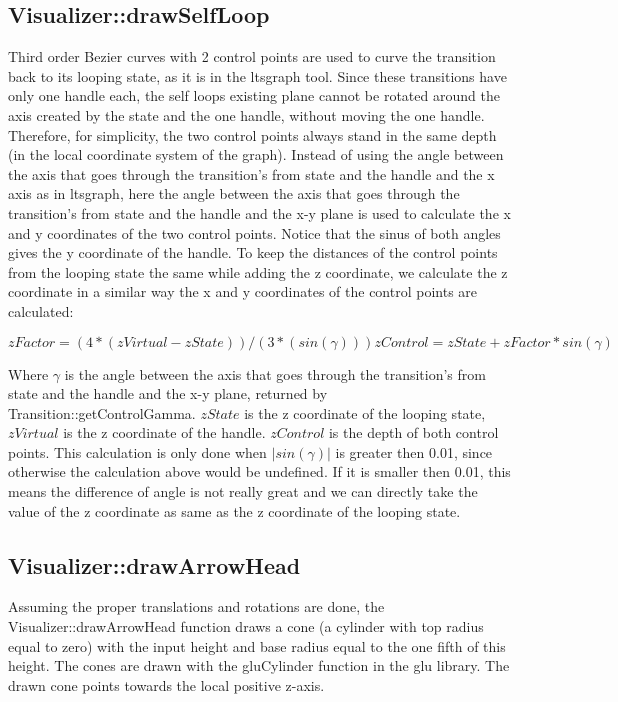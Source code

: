 \documentclass[a4paper]{article}
\begin{document}
\subsection{Visualizer::drawSelfLoop}
Third order Bezier curves with 2 control points are used to curve the transition back to its looping state, as it is in the ltsgraph tool. Since these transitions have only one handle each, the self loops existing plane cannot be rotated around the axis created by the state and the one handle, without moving the one handle. Therefore, for simplicity, the two control points always stand in the same depth (in the local coordinate system of the graph). Instead of using the angle between the axis that goes through the transition's from state and the handle and the x axis as in ltsgraph, here the angle between the axis that goes through the transition's from state and the handle and the x-y plane is used to calculate the x and y coordinates of the two control points. Notice that the sinus of both angles gives the y coordinate of the handle. To keep the distances of the control points from the looping state the same while adding the z coordinate, we calculate the z coordinate in a similar way the x and y coordinates of the control points are calculated:
\begin{center}
\begin{math}
zFactor = (4 * (zVirtual - zState)) / (3 * (sin(\gamma)))
zControl = zState + zFactor * sin(\gamma)
\end{math}
\end{center}
Where $\gamma$ is the angle between the axis that goes through the transition's from state and the handle and the x-y plane, returned by Transition::getControlGamma. $zState$ is the z coordinate of the looping state, $zVirtual$ is the z coordinate of the handle. $zControl$ is the depth of both control points. This calculation is only done when $|sin(\gamma)|$ is greater then 0.01, since otherwise the calculation above would be undefined. If it is smaller then 0.01, this means the difference of angle is not really great and we can directly take the value of the z coordinate as same as the z coordinate of the looping state.
\subsection{Visualizer::drawArrowHead}
Assuming the proper translations and rotations are done, the Visualizer::drawArrowHead function draws a cone (a cylinder with top radius equal to zero) with the input height and base radius equal to the one fifth of this height. The cones are drawn with the gluCylinder function in the glu library. The drawn cone points towards the local positive z-axis.
\end{document}
